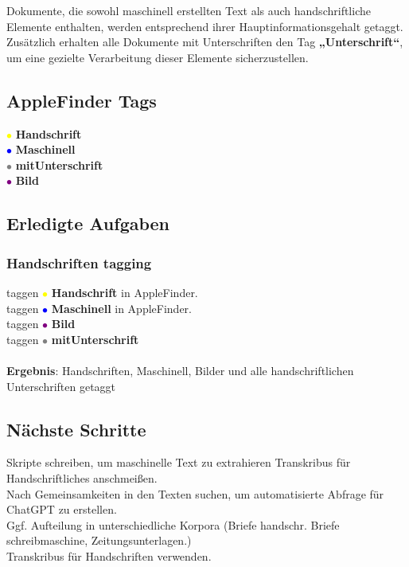 \documentclass{article}
\begin{document}
Dokumente, die sowohl maschinell erstellten Text als auch handschriftliche Elemente enthalten, werden entsprechend ihrer Hauptinformationsgehalt getaggt. Zusätzlich erhalten alle Dokumente mit Unterschriften den Tag \textbf{„Unterschrift“}, um eine gezielte Verarbeitung dieser Elemente sicherzustellen.

\subsection{AppleFinder Tags}

\textcolor{yellow}{\Large $\bullet$} \textbf{Handschrift} \\
\textcolor{blue}{\Large $\bullet$} \textbf{Maschinell} \\
\textcolor{gray}{\Large $\bullet$} \textbf{mitUnterschrift} \\
\textcolor{purple}{\Large $\bullet$} \textbf{Bild} \\

\subsection*{Erledigte Aufgaben}
\subsubsection*{\small Handschriften tagging}
 taggen \textcolor{yellow}{\Large $\bullet$} \textbf{Handschrift} in AppleFinder. \\
 taggen \textcolor{blue}{\Large $\bullet$} \textbf{Maschinell} in AppleFinder. \\
 taggen \textcolor{purple}{\Large $\bullet$} \textbf{Bild} \\
 taggen \textcolor{gray}{\Large $\bullet$} \textbf{mitUnterschrift} \\
\\
\textbf{Ergebnis}: Handschriften, Maschinell, Bilder und alle handschriftlichen Unterschriften getaggt

\subsection*{Nächste Schritte}
 Skripte schreiben, um maschinelle Text zu extrahieren 
 Transkribus für Handschriftliches anschmeißen. \\
 Nach Gemeinsamkeiten in den Texten suchen, um automatisierte Abfrage für ChatGPT zu erstellen. \\ 
 Ggf. Aufteilung in unterschiedliche Korpora (Briefe handschr. Briefe schreibmaschine, Zeitungsunterlagen.)\\
 Transkribus für Handschriften verwenden. \\
\end{document}
